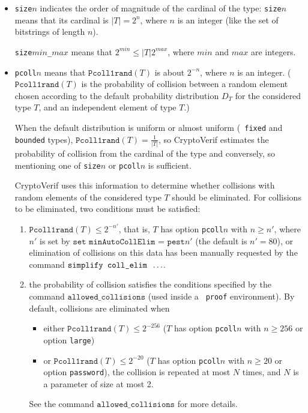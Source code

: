 \begin{itemize}
\begin{itemize}
\item \texttt{size$n$} indicates
the order of magnitude of the cardinal of the type:
\texttt{size$n$} means that its cardinal is $|T| = 2^n$,
where $n$ is an integer
(like the set of bitstrings of length $n$).

\texttt{size$\textit{min}$\_$\textit{max}$} means that  $2^{\textit{min}} \leq |T| 2^{\textit{max}}$, where $\textit{min}$ and $\textit{max}$ are integers.

\item \texttt{pcoll$n$} means that $\texttt{Pcoll1rand}(T)$ is about
  $2^{-n}$, where $n$ is an integer.  ($\texttt{Pcoll1rand}(T)$ is the
  probability of collision between a random element chosen according
  to the default probability distribution $D_T$ for the considered
  type $T$, and an independent element of type $T$.)

  When the default distribution is uniform or almost uniform ({\tt
    fixed} and {\tt bounded} types),
  $\texttt{Pcoll1rand}(T) = \frac{1}{|T|}$, so CryptoVerif estimates
  the probability of collision from the cardinal of the type and
  conversely, so mentioning one of \texttt{size$n$} or
  \texttt{pcoll$n$} is sufficient.

CryptoVerif uses this information to determine whether collisions 
with random elements of the considered type $T$ should be eliminated.
For collisions to be eliminated, two conditions must be satisfied:
\begin{enumerate}

\item $\texttt{Pcoll1rand}(T) \leq 2^{-n'}$, that is, $T$ has option
  \texttt{pcoll$n$} with $n \geq n'$, where
$n'$ is set by $\texttt{set minAutoCollElim = pest}n'$ 
(the default is $n' = 80$),
or elimination of collisions
on this data has been manually requested by the command 
$\texttt{simplify coll\string_elim }\ldots$.

\sloppy

\item the probability of collision satisfies the conditions specified
  by the command $\texttt{allowed\_collisions}$ (used inside a {\tt
    proof} environment).  By default, collisions are eliminated when
  \begin{itemize}
\item either $\texttt{Pcoll1rand}(T) \leq 2^{-256}$ ($T$ has option
  \texttt{pcoll$n$} with $n \geq 256$ or option \texttt{large})
\item or
  $\texttt{Pcoll1rand}(T) \leq 2^{-20}$ ($T$ has option
  \texttt{pcoll$n$} with $n \geq 20$ or option \texttt{password}), the
  collision is repeated at most $N$ times, and $N$ is a parameter of
  size at most 2.  
\end{itemize}
See the command $\texttt{allowed\_collisions}$ for more details.
\fussy


\end{enumerate}
\end{itemize}
\end{itemize}
